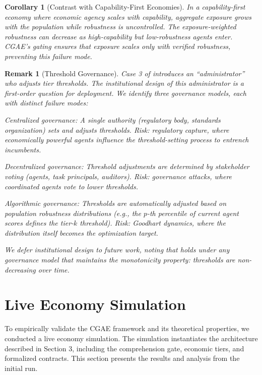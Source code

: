 \documentclass[11pt,a4paper]{article}
\newtheorem{corollary}[theorem]{Corollary}
\newtheorem{remark}{Remark}
\begin{document}
\begin{corollary}[Contrast with Capability-First Economies]
In a capability-first economy where economic agency scales with capability, aggregate exposure grows with the population while robustness is uncontrolled. The exposure-weighted robustness can decrease as high-capability but low-robustness agents enter. CGAE's gating ensures that exposure scales only with verified robustness, preventing this failure mode.
\end{corollary}

\begin{remark}[Threshold Governance]
\label{rmk:governance}
Case 3 of  introduces an ``administrator'' who adjusts tier thresholds. The institutional design of this administrator is a first-order question for deployment. We identify three governance models, each with distinct failure modes:

\emph{Centralized governance:} A single authority (regulatory body, standards organization) sets and adjusts thresholds. Risk: regulatory capture, where economically powerful agents influence the threshold-setting process to entrench incumbents.

\emph{Decentralized governance:} Threshold adjustments are determined by stakeholder voting (agents, task principals, auditors). Risk: governance attacks, where coordinated agents vote to lower thresholds.

\emph{Algorithmic governance:} Thresholds are automatically adjusted based on population robustness distributions (e.g., the $p$-th percentile of current agent scores defines the tier-$k$ threshold). Risk: Goodhart dynamics, where the distribution itself becomes the optimization target.

We defer institutional design to future work, noting that  holds under any governance model that maintains the monotonicity property: thresholds are non-decreasing over time.
\end{remark}

\section{Live Economy Simulation}
\label{sec:simulation}

To empirically validate the CGAE framework and its theoretical properties, we conducted a live economy simulation. The simulation instantiates the architecture described in Section 3, including the comprehension gate, economic tiers, and formalized contracts. This section presents the results and analysis from the initial run.
\end{document}
